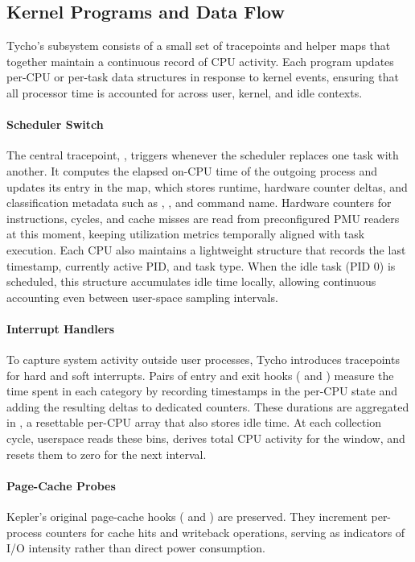 \subsection{Kernel Programs and Data Flow}
\label{subsec:ebpf-programs}

Tycho’s  subsystem consists of a small set of tracepoints and helper maps that together maintain a continuous record of CPU activity.  
Each program updates per-CPU or per-task data structures in response to kernel events, ensuring that all processor time is accounted for across user, kernel, and idle contexts.

\paragraph{Scheduler Switch}
The central tracepoint, , triggers whenever the scheduler replaces one task with another.  
It computes the elapsed on-CPU time of the outgoing process and updates its entry in the  map, which stores runtime, hardware counter deltas, and classification metadata such as , , and command name.  
Hardware counters for instructions, cycles, and cache misses are read from preconfigured PMU readers at this moment, keeping utilization metrics temporally aligned with task execution.  
Each CPU also maintains a lightweight  structure that records the last timestamp, currently active PID, and task type.  
When the idle task (PID 0) is scheduled, this structure accumulates idle time locally, allowing continuous accounting even between user-space sampling intervals.

\paragraph{Interrupt Handlers}
To capture system activity outside user processes, Tycho introduces tracepoints for hard and soft interrupts.  
Pairs of entry and exit hooks ( and ) measure the time spent in each category by recording timestamps in the per-CPU state and adding the resulting deltas to dedicated counters.  
These durations are aggregated in , a resettable per-CPU array that also stores idle time.  
At each collection cycle, userspace reads these bins, derives total CPU activity for the window, and resets them to zero for the next interval.

\paragraph{Page-Cache Probes}
Kepler’s original page-cache hooks ( and ) are preserved.  
They increment per-process counters for cache hits and writeback operations, serving as indicators of I/O intensity rather than direct power consumption.

